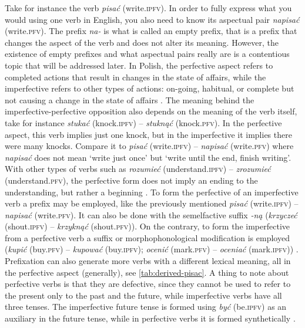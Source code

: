 \documentclass[12pt]{article}
\begin{document}
Take for instance the verb \textit{pisać} (write.\textsc{ipfv}). In order to fully express what you would using one verb in English, you also need to know its aspectual pair \textit{napisać} (write.\textsc{pfv}). The prefix \textit{na-} is what is called an empty prefix, that is a prefix that changes the aspect of the verb and does not alter its meaning. However, the existence of empty prefixes and what aspectual pairs really are is a contentious topic that will be addressed later. In Polish, the perfective aspect refers to completed actions that result in changes in the state of affairs, while the imperfective refers to other types of actions: on-going, habitual, or complete but not causing a change in the state of affairs \parencite{swan2002GrammarContemporaryPolish}. The meaning behind the imperfective-perfective opposition also depends on the meaning of the verb itself, take for instance \textit{stukać} (knock.\textsc{ipfv}) -- \textit{stuknąć} (knock.\textsc{pfv}). In the perfective aspect, this verb implies just one knock, but in the imperfective it implies there were many knocks. Compare it to \textit{pisać} (write.\textsc{ipfv}) -- \textit{napisać} (write.\textsc{pfv}) where \textit{napisać} does not mean `write just once' but `write until the end, finish writing'. With other types of verbs such as \textit{rozumieć} (understand.\textsc{ipfv}) -- \textit{zrozumieć} (understand.\textsc{pfv}), the perfective form does not imply an ending to the understanding, but rather a beginning  \parencite{nagorko2010PodrecznaGramatykaJezyka}.
To form the perfective of an imperfective verb a prefix may be employed, like the previously mentioned \textit{pisać} (write.\textsc{ipfv}) -- \textit{napisać} (write.\textsc{pfv}). It can also be done with the semelfactive suffix \textit{-ną} (\textit{krzyczeć} (shout.\textsc{ipfv}) -- \textit{krzyknąć} (shout.\textsc{pfv})). On the contrary, to form the imperfective from a perfective verb a suffix or morphophonological modification is employed (\textit{kupić} (buy.\textsc{pfv}) -- \textit{kupować} (buy.\textsc{ipfv}); \textit{ocenić} (mark.\textsc{pfv}) -- \textit{oceniać} (mark.\textsc{ipfv})) \parencite{bloch-trojnar2015GrammaticalAspectLexical}. 
Prefixation can also generate more verbs with a different lexical meaning, all in the perfective aspect (generally), see \autoref{tab:derived-pisac}. A thing to note about perfective verbs is that they are defective, since they cannot be used to refer to the present only to the past and the future, while imperfective verbs have all three tenses. The imperfective future tense is formed using \textit{być} (be.\textsc{ipfv}) as an auxiliary in the future tense, while in perfective verbs it is formed synthetically \parencite{willim2006EventIndividuationCountability}.
\end{document}
